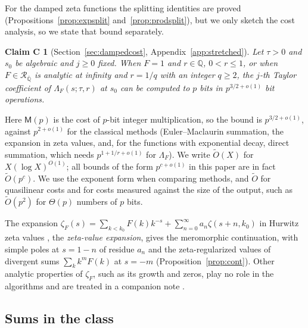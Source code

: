 \documentclass[11pt,reqno]{amsart}
\newtheorem*{claimC}{Claim C}
\theoremstyle{definition}
\theoremstyle{remark}
\newcommand{\QQ}{\mathbb{Q}}
\newcommand{\Qbar}{\overline{\mathbb{Q}}}
\newcommand{\RegQ}{\mathcal{R}_{\Qbar}}
\newcommand{\Mul}{\mathsf{M}}
\begin{document}
For the damped zeta functions the splitting identities are proved (Propositions~\ref{prop:expsplit}
and~\ref{prop:prodsplit}), but we only sketch the cost analysis, so we state that bound separately.

\begin{claimC}[Section~\ref{sec:dampedcost}, Appendix~\ref{app:stretched}]
Let $\tau > 0$ and $s_0$ be algebraic and $j \ge 0$ fixed. When $F = 1$ and $r \in \QQ$, $0 < r \le 1$, or when
$F \in \RegQ$ is analytic at infinity and $r = 1/q$ with an integer $q \ge 2$, the $j$-th Taylor coefficient of
$\Lambda_F(s;\tau,r)$ at $s_0$ can be computed to $p$ bits in $p^{3/2+o(1)}$ bit operations.
\end{claimC}

Here $\Mul(p)$ is the cost of $p$-bit integer multiplication, so the bound is $p^{3/2+o(1)}$, against
$p^{2+o(1)}$ for the classical methods (Euler--Maclaurin summation, the expansion in zeta values, and, for the
functions with exponential decay, direct summation, which needs $p^{1+1/r+o(1)}$ for $\Lambda_F$). We write
$\widetilde O(X)$ for $X(\log X)^{O(1)}$; all bounds of the form $p^{c+o(1)}$ in this paper are in fact
$\widetilde O(p^c)$. We use the exponent form when comparing methods, and $\widetilde O$ for quasilinear costs and for
costs measured against the size of the output, such as $\widetilde O(p^2)$ for $\Theta(p)$ numbers of $p$ bits.

The expansion $\zeta_F(s) = \sum_{k<k_0}F(k)k^{-s} + \sum_{n=0}^{\infty}a_n\zeta(s+n,k_0)$ in Hurwitz zeta values
\cite{FV96}, the \emph{zeta-value expansion}, gives the meromorphic continuation, with simple poles at $s = 1-n$ of residue $a_n$ and the
zeta-regularized values of divergent sums $\sum_kk^mF(k)$ at $s = -m$ \cite{Eli95,Kir02}
(Proposition~\ref{prop:cont}). Other analytic properties of $\zeta_F$, such as its growth and zeros, play no role in the
algorithms and are treated in a companion note \cite{Joh26}.

\subsection{Sums in the class}\label{sec:sums}
\end{document}
